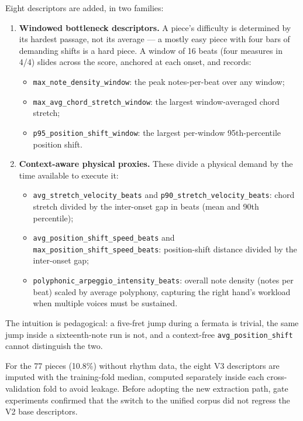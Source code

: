 Eight descriptors are added, in two families:
\begin{enumerate}
    \item \textbf{Windowed bottleneck descriptors.} A piece's difficulty is determined by its hardest passage, not its average --- a mostly easy piece with four bars of demanding shifts is a hard piece. A window of 16 beats (four measures in 4/4) slides across the score, anchored at each onset, and records:
    \begin{itemize}
        \item \texttt{max\_note\_density\_window}: the peak notes-per-beat over any window;
        \item \texttt{max\_avg\_chord\_stretch\_window}: the largest window-averaged chord stretch;
        \item \texttt{p95\_position\_shift\_window}: the largest per-window 95th-percentile position shift.
    \end{itemize}
    \item \textbf{Context-aware physical proxies.} These divide a physical demand by the time available to execute it:
    \begin{itemize}
        \item \texttt{avg\_stretch\_velocity\_beats} and \texttt{p90\_stretch\_velocity\_beats}: chord stretch divided by the inter-onset gap in beats (mean and 90th percentile);
        \item \texttt{avg\_position\_shift\_speed\_beats} and \texttt{max\_position\_shift\_speed\_beats}: position-shift distance divided by the inter-onset gap;
        \item \texttt{polyphonic\_arpeggio\_intensity\_beats}: overall note density (notes per beat) scaled by average polyphony, capturing the right hand's workload when multiple voices must be sustained.
    \end{itemize}
\end{enumerate}
The intuition is pedagogical: a five-fret jump during a fermata is trivial, the same jump inside a sixteenth-note run is not, and a context-free \texttt{avg\_position\_shift} cannot distinguish the two.

For the 77 pieces (10.8\%) without rhythm data, the eight V3 descriptors are imputed with the training-fold median, computed separately inside each cross-validation fold to avoid leakage. Before adopting the new extraction path, gate experiments confirmed that the switch to the unified corpus did not regress the V2 base descriptors.

